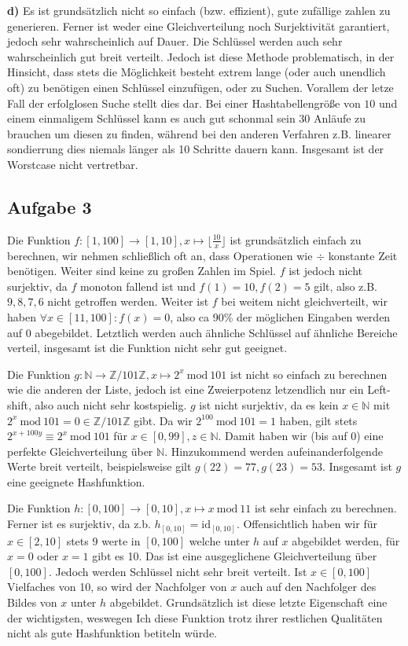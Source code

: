 \documentclass[a4paper,graphics,11pt]{article}
\newcommand{\aufgabe}[1]{\subsection*{Aufgabe #1}}
\begin{document}
\textbf{d)}
Es ist grundsätzlich nicht so einfach (bzw. effizient), gute zufällige zahlen zu generieren. Ferner ist weder eine Gleichverteilung noch
Surjektivität garantiert, jedoch sehr wahrscheinlich auf Dauer. Die Schlüssel werden auch sehr wahrscheinlich gut breit verteilt.
Jedoch ist diese Methode problematisch, in der Hinsicht, dass stets die Möglichkeit besteht extrem lange (oder auch unendlich oft) zu benötigen
einen Schlüssel einzufügen, oder zu Suchen. Vorallem der letze Fall der erfolglosen Suche stellt dies dar. Bei einer Hashtabellengröße von
$10$ und einem einmaligem Schlüssel kann es auch gut schonmal sein 30 Anläufe zu brauchen um diesen zu finden, während bei den anderen Verfahren
z.B. linearer sondierrung dies niemals länger als 10 Schritte dauern kann. Insgesamt ist der Worstcase nicht vertretbar.


\newpage
\aufgabe{3}
Die Funktion $f : [1,100] \to [1,10], x \mapsto \lfloor \frac{10}{x} \rfloor$ ist grundsätzlich einfach zu berechnen,
wir nehmen schließlich oft an, dass Operationen wie $\div$ konstante Zeit benötigen. Weiter sind keine zu großen Zahlen im Spiel.
$f$ ist jedoch nicht surjektiv, da $f$ monoton fallend ist und $f(1) = 10, f(2) = 5$ gilt, also z.B. $9,8,7,6$ nicht getroffen
werden. Weiter ist $f$ bei weitem nicht gleichverteilt, wir haben $\forall x \in [11, 100] : f(x) = 0$, also ca 90\% der
möglichen Eingaben werden auf 0 abegebildet. Letztlich werden auch ähnliche Schlüssel auf ähnliche Bereiche verteil, insgesamt
ist die Funktion nicht sehr gut geeignet.

Die Funktion $g:\mathbb{N} \to \mathbb{Z}/101\mathbb{Z}, x \mapsto 2^x\ \text{mod}\ 101$ ist nicht so einfach zu berechnen wie
die anderen der Liste, jedoch ist eine Zweierpotenz letzendlich nur ein Left-shift, also auch nicht sehr kostspielig.
$g$ ist nicht surjektiv, da es kein $x \in \mathbb{N}$ mit $2^x\ \text{mod}\ 101 = 0 \in \mathbb{Z}/101\mathbb{Z}$ gibt.
Da wir $2^{100}\ \text{mod}\ 101 = 1$ haben,
gilt stets $2^{x+100y} \equiv 2^x\ \text{mod}\ 101$ für $x \in [0,99], z \in \mathbb{N}$. Damit haben wir (bis auf 0) eine
perfekte Gleichverteilung über $\mathbb{N}$. Hinzukommend werden aufeinanderfolgende Werte breit verteilt, beispielsweise
gilt $g(22) = 77, g(23) = 53$. Insgesamt ist $g$ eine geeignete Hashfunktion.

Die Funktion $h:[0, 100] \to [0,10], x \mapsto x\ \text{mod}\ 11$ ist sehr einfach zu berechnen. Ferner ist es surjektiv, da
z.b. $h_{[0,10]} = \text{id}_{[0,10]}$. Offensichtlich haben wir für $x \in [2,10]$ stets 9 werte in $[0,100]$ welche
unter $h$ auf $x$ abgebildet werden, für $x = 0$ oder $x=1$ gibt es 10. Das ist eine ausgeglichene Gleichverteilung über
$[0,100]$. Jedoch werden Schlüssel nicht sehr breit verteilt. Ist $x \in [0,100]$ Vielfaches von 10, so wird der Nachfolger
von $x$ auch auf den Nachfolger des Bildes von $x$ unter $h$ abgebildet. Grundsätzlich ist diese letzte Eigenschaft eine
der wichtigsten, weswegen Ich diese Funktion trotz ihrer restlichen Qualitäten nicht als gute Hashfunktion betiteln würde.
\end{document}
